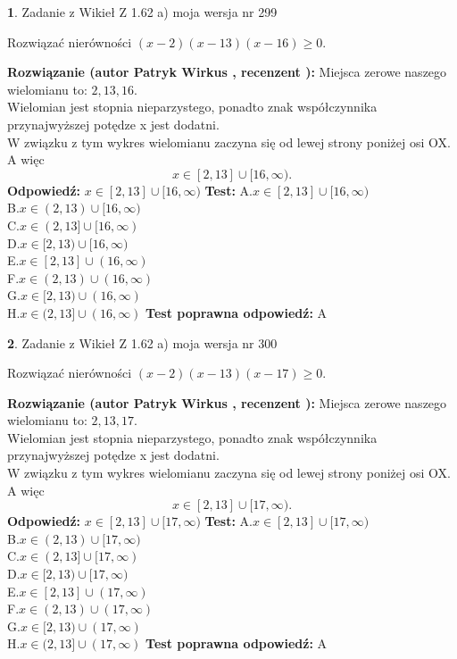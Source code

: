 \documentclass[12pt, a4paper]{article}
\theoremstyle{definition} %
\newtheorem{zad}{}
\newcommand{\zadStart}[1]{\begin{zad}#1\newline}
\newcommand{\zadStop}{\end{zad}}
\newcommand{\rozwStart}[2]{\noindent \textbf{Rozwiązanie (autor #1 , recenzent #2): }\newline}
\newcommand{\rozwStop}{\newline}
\newcommand{\odpStart}{\noindent \textbf{Odpowiedź:}\newline}
\newcommand{\odpStop}{\newline}
\newcommand{\testStart}{\noindent \textbf{Test:}\newline}
\newcommand{\testStop}{\newline}
\newcommand{\kluczStart}{\noindent \textbf{Test poprawna odpowiedź:}\newline}
\newcommand{\kluczStop}{\newline}
\begin{document}
\zadStart{Zadanie z Wikieł Z 1.62 a) moja wersja nr 299}

Rozwiązać nierówności $(x-2)(x-13)(x-16)\ge0$.
\zadStop
\rozwStart{Patryk Wirkus}{}
Miejsca zerowe naszego wielomianu to: $2, 13, 16$.\\
Wielomian jest stopnia nieparzystego, ponadto znak współczynnika przy\linebreak najwyższej potędze x jest dodatni.\\ W związku z tym wykres wielomianu zaczyna się od lewej strony poniżej osi OX. A więc $$x \in [2,13] \cup [16,\infty).$$
\rozwStop
\odpStart
$x \in [2,13] \cup [16,\infty)$
\odpStop
\testStart
A.$x \in [2,13] \cup [16,\infty)$\\
B.$x \in (2,13) \cup [16,\infty)$\\
C.$x \in (2,13] \cup [16,\infty)$\\
D.$x \in [2,13) \cup [16,\infty)$\\
E.$x \in [2,13] \cup (16,\infty)$\\
F.$x \in (2,13) \cup (16,\infty)$\\
G.$x \in [2,13) \cup (16,\infty)$\\
H.$x \in (2,13] \cup (16,\infty)$
\testStop
\kluczStart
A
\kluczStop



\zadStart{Zadanie z Wikieł Z 1.62 a) moja wersja nr 300}

Rozwiązać nierówności $(x-2)(x-13)(x-17)\ge0$.
\zadStop
\rozwStart{Patryk Wirkus}{}
Miejsca zerowe naszego wielomianu to: $2, 13, 17$.\\
Wielomian jest stopnia nieparzystego, ponadto znak współczynnika przy\linebreak najwyższej potędze x jest dodatni.\\ W związku z tym wykres wielomianu zaczyna się od lewej strony poniżej osi OX. A więc $$x \in [2,13] \cup [17,\infty).$$
\rozwStop
\odpStart
$x \in [2,13] \cup [17,\infty)$
\odpStop
\testStart
A.$x \in [2,13] \cup [17,\infty)$\\
B.$x \in (2,13) \cup [17,\infty)$\\
C.$x \in (2,13] \cup [17,\infty)$\\
D.$x \in [2,13) \cup [17,\infty)$\\
E.$x \in [2,13] \cup (17,\infty)$\\
F.$x \in (2,13) \cup (17,\infty)$\\
G.$x \in [2,13) \cup (17,\infty)$\\
H.$x \in (2,13] \cup (17,\infty)$
\testStop
\kluczStart
A
\kluczStop
\end{document}
